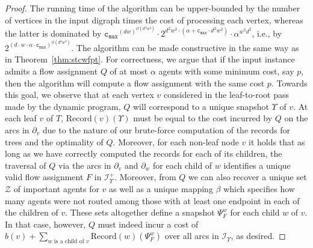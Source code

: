 \documentclass[letterpaper]{article} %
\newcommand{\bigoh}{\ensuremath{{\mathcal O}}}
\newcommand{\cmax}{\mathtt{c_{max}}}
\newcommand{\Rec}{\text{Record}}
\newcommand{\Imp}{\mathcal{Z}}
\begin{document}
\begin{proof}
\vspace{-0.76mm}
\vspace{-1.52mm}
The running time of the algorithm can be upper-bounded by the number of vertices in the input digraph times the cost of processing each vertex, whereas the latter is dominated by $\cmax^{(dw)^{\bigoh(d^4w^4)}}\cdot 2^{d^2w^2\cdot (\alpha+\cmax\cdot d^2w^2)} \cdot \alpha^{w^2d^2}$, i.e., by $2^{(d\cdot w\cdot \alpha\cdot \cmax)^{\bigoh(d^4w^4)}}$. The algorithm can be made constructive in the same way as in Theorem~\ref{thm:stcwfpt}. For correctness, we argue that if the input instance admits a flow assignment $Q$ of at most $\alpha$ agents with some minimum cost, say $p$, then the algorithm will compute a flow assignment with the same cost $p$. Towards this goal, we observe that at each vertex $v$ considered in the leaf-to-root pass made by the dynamic program, $Q$ will correspond to a unique snapshot $\Upsilon$ of $v$. At each leaf $v$ of $T$, $\Rec(v)(\Upsilon)$ must be equal to the cost incurred by $Q$ on the arcs in $\partial_v$ due to the nature of our brute-force computation of the records for trees and the optimality of $Q$. Moreover, for each non-leaf node $v$ it holds that as long as we have correctly computed the records for each of its children, the traversal of $Q$ via the arcs in $\partial_v$ and $\partial_w$ for each child of $w$ identifies a unique valid flow assignment $F$ in $\mathcal{I}^+_\Upsilon$. Moreover, from $Q$ we can also recover a unique set $\Imp$ of important agents for $v$ as well as a unique mapping $\beta$ which specifies how many agents were not routed among those with at least one endpoint in each of the children of $v$. These sets altogether define a snapshot $\Psi^w_F$ for each child $w$ of $v$. In that case, however, $Q$ must indeed incur a cost of $b(v)+\sum_{w\text{ is a child of }v}\Rec(w)(\Psi^w_F)$ over all arcs in $\mathcal{I}_\Upsilon$, as desired.
\end{proof}
\end{document}
